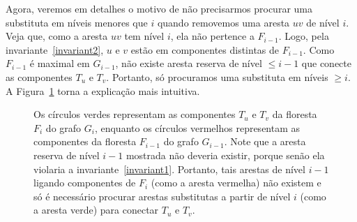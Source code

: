 Agora, veremos em detalhes o motivo de não precisarmos procurar uma substituta em níveis menores que $i$ quando removemos uma aresta $uv$ de nível $i$. Veja que, como a aresta $uv$ tem nível $i$, ela não pertence a $F_{i-1}$. Logo, pela invariante~\ref{invariant2}, $u$ e $v$ estão em componentes distintas de $F_{i-1}$. Como $F_{i-1}$ é maximal em $G_{i-1}$, não existe aresta reserva de nível $\leq i - 1$ que conecte as componentes $T_u$ e $T_v$. Portanto, só procuramos uma substituta em níveis $\geq i$. A Figura~\ref{fig:why-not-search-in-less-or-equal-than-i} torna a explicação mais intuitiva.

\begin{figure}[H]
    \centering
    \caption{Os círculos verdes representam as componentes $T_u$ e $T_v$ da floresta $F_i$ do grafo $G_i$, enquanto os círculos vermelhos representam as componentes da floresta $F_{i-1}$ do grafo $G_{i-1}$. Note que a aresta reserva de nível $i-1$ mostrada não deveria existir, porque senão ela violaria a invariante~\ref{invariant1}. Portanto, tais arestas de nível $i-1$ ligando componentes de $F_i$ (como a aresta vermelha) não existem e só é necessário procurar arestas substitutas a partir de nível $i$ (como a aresta verde) para conectar $T_u$ e $T_v$.}
    \label{fig:why-not-search-in-less-or-equal-than-i}
\end{figure}

